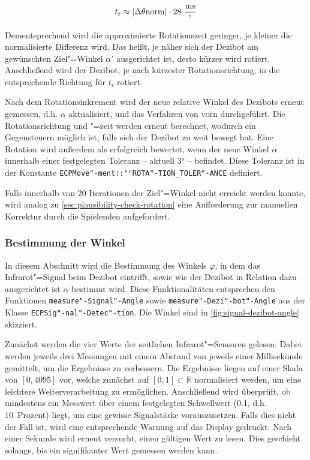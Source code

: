 {\begin{equation*}
    t_{\text{r}} \approx \vert\Delta\theta{\text{norm}}\vert \cdot 28~\frac{\text{ms}}{^\circ}
\end{equation*}

Dementsprechend wird die approximierte Rotationszeit geringer, je kleiner die normalisierte Differenz wird. Das heißt, je näher sich der Dezibot am gewünschten Ziel"=Winkel $\alpha'$ ausgerichtet ist, desto kürzer wird rotiert. Anschließend wird der Dezibot, je nach kürzester Rotationsrichtung, in die entsprechende Richtung für $t_{\text{r}}$ rotiert.

Nach dem Rotationsinkrement wird der neue relative Winkel des Dezibots erneut gemessen, d.h. $\alpha$ aktualisiert, und das Verfahren von vorn durchgeführt. Die Rotationsrichtung und "=zeit werden erneut berechnet, wodurch ein Gegensteuern möglich ist, falls sich der Dezibot zu weit bewegt hat. Eine Rotation wird außerdem als erfolgreich bewertet, wenn der neue Winkel $\alpha$ innerhalb einer festgelegten Toleranz -- aktuell 3° -- befindet. Diese Toleranz ist in der Konstante \texttt{ECPMove"-ment::""ROTA"-TION\_TOLER"-ANCE} definiert.

Falls innerhalb von 20 Iterationen der Ziel"=Winkel nicht erreicht werden konnte, wird analog zu \autoref{sec:plausibility-check-rotation} eine Aufforderung zur manuellen Korrektur durch die Spielenden aufgefordert.


\subsubsection{Bestimmung der Winkel}
\label{sec:angle-determination}

In diesem Abschnitt wird die Bestimmung des Winkels $\varphi$, in dem das Infrarot"=Signal beim Dezibot eintrifft, sowie wie der Dezibot in Relation dazu ausgerichtet ist $\alpha$ bestimmt wird. Diese Funktionalitäten entsprechen den Funktionen \texttt{measure"-Signal"-Angle} sowie \texttt{measure"-Dezi"-bot"-Angle} aus der Klasse \texttt{ECPSig"-nal"-Detec"-tion}. Die Winkel sind in \autoref{fig:signal-dezibot-angle} skizziert.
 
Zunächst werden die vier Werte der seitlichen Infrarot"=Sensoren gelesen. Dabei werden jeweils drei Messungen mit einem Abstand von jeweils einer Millisekunde gemittelt, um die Ergebnisse zu verbessern. Die Ergebnisse liegen auf einer Skala von $[0,4095]$ vor, welche zunächst auf $[0,1] \subset \mathbb{R}$ normalisiert werden, um eine leichtere Weiterverarbeitung zu ermöglichen. Anschließend wird überprüft, ob mindestens ein Messwert über einem festgelegten Schwellwert (0.1, d.h. 10~Prozent) liegt, um eine gewisse Signalstärke vorauszusetzen. Falls dies nicht der Fall ist, wird eine entsprechende Warnung auf das Display gedruckt. Nach einer Sekunde wird erneut versucht, einen gültigen Wert zu lesen. Dies geschieht solange, bis ein signifikanter Wert gemessen werden kann.

}
